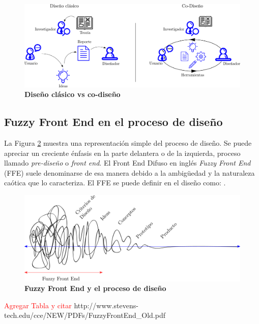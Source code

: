 \begin{figure}
\centering
\includegraphics[width=14cm]{Img/CPD/1-co.png}
\caption{\textbf{\footnotesize{Diseño clásico vs co-diseño}}}
\label{fig: co}
\end{figure}


\subsection{Fuzzy Front End en el proceso de diseño}
La Figura \ref{fig:fuzzy1} muestra una representación simple del proceso de diseño. Se puede apreciar un creciente énfasis en la parte delantera o de la izquierda, proceso llamado \textit{pre-diseño} o \textit{front end}.
El Front End Difuso en inglés  \textit{Fuzzy Front End} (FFE) suele denominarse de esa manera debido a la ambigüedad y la naturaleza caótica que lo caracteriza. El FFE se puede definir en el diseño como:  \citep{schreiner}.

\begin{figure}
\centering
\includegraphics[width=14cm]{Img/CPD/cpd-fuzzy.png}
\caption{\textbf{\footnotesize{Fuzzy Front End y el proceso de diseño}}}
\label{fig:fuzzy1}
\end{figure}

\textcolor{red}{Agregar Tabla y citar }http://www.stevens-tech.edu/cce/NEW/PDFs/FuzzyFrontEnd_Old.pdf


